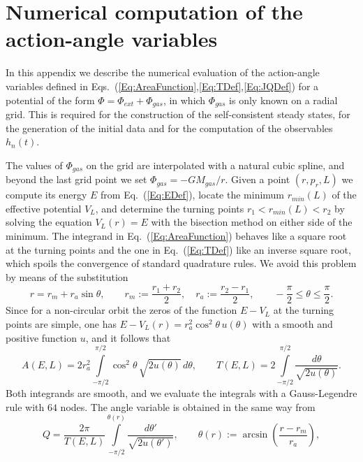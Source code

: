 \section{Numerical computation of the action-angle variables}
\label{App:ActionAngle}

In this appendix we describe the numerical evaluation of the action-angle variables defined in Eqs.~(\ref{Eq:AreaFunction},\ref{Eq:TDef},\ref{Eq:JQDef}) for a potential of the form $\Phi = \Phi_{ext} + \Phi_{gas}$, in which $\Phi_{gas}$ is only known on a radial grid. This is required for the construction of the self-consistent steady states, for the generation of the initial data and for the computation of the observables $h_n(t)$.

The values of $\Phi_{gas}$ on the grid are interpolated with a natural cubic spline, and beyond the last grid point we set $\Phi_{gas} = -G M_{gas}/r$. Given a point $(r,p_r,L)$ we compute its energy $E$ from Eq.~(\ref{Eq:EDef}), locate the minimum $r_{min}(L)$ of the effective potential $V_L$, and determine the turning points $r_1 < r_{min}(L) < r_2$ by solving the equation $V_L(r) = E$ with the bisection method on either side of the minimum. The integrand in Eq.~(\ref{Eq:AreaFunction}) behaves like a square root at the turning points and the one in Eq.~(\ref{Eq:TDef}) like an inverse square root, which spoils the convergence of standard quadrature rules. We avoid this problem by means of the substitution
\begin{equation}
r = r_m + r_a\sin\theta,\qquad
r_m := \frac{r_1 + r_2}{2},\quad r_a := \frac{r_2 - r_1}{2},\qquad
-\frac{\pi}{2}\leq \theta\leq \frac{\pi}{2}.
\label{Eq:ThetaSubstitution}
\end{equation}
Since for a non-circular orbit the zeros of the function $E - V_L$ at the turning points are simple, one has $E - V_L(r) = r_a^2\cos^2\theta\, u(\theta)$ with a smooth and positive function $u$, and it follows that
\begin{equation}
A(E,L) = 2r_a^2\int\limits_{-\pi/2}^{\pi/2} \cos^2\theta\,\sqrt{2u(\theta)}\, d\theta,\qquad
T(E,L) = 2\int\limits_{-\pi/2}^{\pi/2} \frac{d\theta}{\sqrt{2u(\theta)}}.
\label{Eq:ATSmooth}
\end{equation}
Both integrands are smooth, and we evaluate the integrals with a Gauss-Legendre rule with $64$ nodes. The angle variable is obtained in the same way from
\begin{equation}
Q = \frac{2\pi}{T(E,L)}\int\limits_{-\pi/2}^{\theta(r)} \frac{d\theta'}{\sqrt{2u(\theta')}},\qquad
\theta(r) := \arcsin\left( \frac{r - r_m}{r_a} \right),
\label{Eq:QSmooth}
\end{equation}
